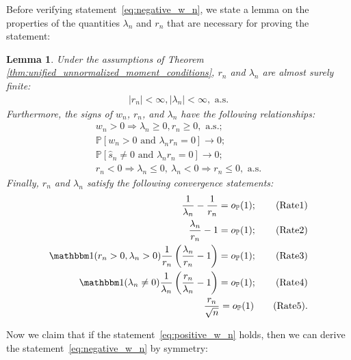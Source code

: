 \documentclass[12pt]{article}
\newtheorem{lemma}{Lemma}
\theoremstyle{definition}
\def\P{\mathbb{P}}
\def\P{\mathbb{P}}
\renewcommand{\P}{\mathbb{P}}							%
\newcommand{\indicator}{\mathbbm 1}						%
\begin{document}
Before verifying statement~\eqref{eq:negative_w_n}, we state a lemma on the properties of the quantities $\lambda_n$ and $r_n$ that are necessary for proving the statement:
\begin{lemma}\label{lem:additional_properties_r_n_lambda_n}
Under the assumptions of Theorem \ref{thm:unified_unnormalized_moment_conditions}, $r_n$ and $\lambda_n$ are almost surely finite:
	\begin{align}
		|r_n|<\infty, |\lambda_n|<\infty,\text{ a.s.} \tag{Finite} \label{eq:finitness_r_n_lambda_n}
	\end{align}
Furthermore, the signs of $w_n$, $r_n$, and $\lambda_n$ have the following relationships:
	\begin{align}
		w_n > 0 \Rightarrow \lambda_n \geq 0, r_n \geq 0,\text{ a.s.}; \tag{Sign1} \label{eq:sign_1} \\
		\P[w_n>0\text{ and }\lambda_nr_n = 0]\rightarrow 0; \tag{Sign2} \label{eq:same_sign_condition} \\
		\P[\hat s_n\neq 0\text{ and }\lambda_nr_n = 0]\rightarrow 0; \tag{Sign3} \label{eq:same_sign_condition_sn} \\
		r_n < 0\Rightarrow \lambda_n\leq 0,\ \lambda_n < 0 \Rightarrow r_n \leq 0,\text{ a.s.} \tag{Sign4} \label{eq:sign_condition_r_lambda}
	\end{align}
Finally, $r_n$ and $\lambda_n$ satisfy the following convergence statements:
	\begin{align}
		\frac{1}{\lambda_n}-\frac{1}{r_n}=o_{\P}(1); \tag{Rate1} \label{eq:rate_1} \\ 
		\frac{\lambda_n}{r_n}-1=o_{\P}(1); \tag{Rate2} \label{eq:rate_2} \\ 
		\indicator(r_n>0,\lambda_n>0)\frac{1}{r_n}\left(\frac{\lambda_n}{r_n}-1\right)=o_{\P}(1); \tag{Rate3} \label{eq:rate_3} \\ 
		\indicator(\lambda_n\neq 0)\frac{1}{\lambda_n}\left(\frac{r_n}{\lambda_n}-1\right)=o_{\P}(1); \tag{Rate4} \label{eq:rate_4} \\ 
		\frac{r_n}{\sqrt{n}}=o_{\P}(1)\tag{Rate5}. \label{eq:rate_r}
	\end{align}
\end{lemma}
\noindent Now we claim that if the statement~\eqref{eq:positive_w_n} holds, then we can derive the statement~\eqref{eq:negative_w_n} by symmetry:
\end{document}
